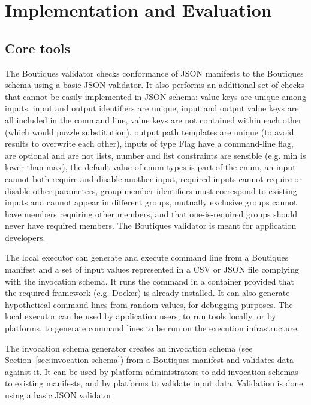 \documentclass{article}
\begin{document}
\section{Implementation and Evaluation}

\subsection{Core tools} 

The Boutiques validator checks conformance of JSON manifests to the
Boutiques schema using a basic JSON validator. It also performs an
additional set of checks that cannot be easily implemented in JSON
schema: value keys are unique among inputs, input and output
identifiers are unique, input and output value keys are all
included in the command line, value keys are not contained
within each other (which would puzzle substitution), output path
templates are unique (to avoid results to overwrite each other),
inputs of type Flag have a command-line flag, are optional and are not
lists, number and list constraints are sensible (e.g. min is lower
than max), the default value of enum types is part of the enum, an
input cannot both require and disable another input, required inputs
cannot require or disable other parameters, group member identifiers
must correspond to existing inputs and cannot appear in different
groups, mutually exclusive groups cannot have members requiring other
members, and that one-is-required groups should never have required
members. The Boutiques validator is meant for application developers.

The local executor can generate and execute command line from a
Boutiques manifest and a set of input values represented in a CSV or
JSON file complying with the invocation schema. It runs the
command in a container provided that the required framework
(e.g. Docker) is already installed. It can also generate hypothetical
command lines from random values, for debugging purposes. The local
executor can be used by application users, to run tools locally, or by
platforms, to generate command lines to be run on the execution
infrastructure.

The invocation schema generator creates an invocation schema (see
Section~\ref{sec:invocation-schema}) from a Boutiques manifest and
validates data against it. It can be used by platform administrators
to add invocation schemas to existing manifests, and by platforms to
validate input data. Validation is done using a basic JSON
validator.
\end{document}
